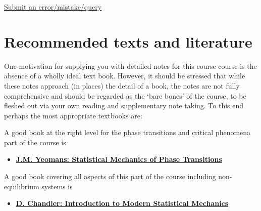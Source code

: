 \documentclass[
  letterpaper,
  enabledeprecatedfontcommands]{report}
\providecommand{\tightlist}{%
  \setlength{\itemsep}{0pt}\setlength{\parskip}{0pt}}
\begin{document}
\begin{tcolorbox}[enhanced jigsaw, colback=white, leftrule=.75mm, breakable, bottomrule=.15mm, left=2mm, arc=.35mm, toprule=.15mm, rightrule=.15mm, opacityback=0, colframe=quarto-callout-note-color-frame]

\href{https://forms.office.com/e/6uL2Bd5QGq}{Submit an
error/mistake/query}

\end{tcolorbox}


\chapter*{Recommended texts and literature}\label{literature}


One motivation for supplying you with detailed notes for this course
course is the absence of a wholly ideal text book. However, it should be
stressed that while these notes approach (in places) the detail of a
book, the notes are not fully comprehensive and should be regarded as
the `bare bones' of the course, to be fleshed out via your own reading
and supplementary note taking. To this end perhaps the most appropriate
textbooks are:

A good book at the right level for the phase transitions and critical
phenomena part of the course is

\begin{itemize}
\tightlist
\item
  \textbf{\href{https://bris.on.worldcat.org/search/detail/24699159?queryString=yeomans\%20statistical&clusterResults=true&stickyFacetsChecked=true&groupVariantRecords=false&newsArticles=off&bookReviews=off}{J.M.
  Yeomans: Statistical Mechanics of Phase Transitions}}
\end{itemize}

A good book covering all aspects of this part of the course including
non-equilibrium systems is

\begin{itemize}
\tightlist
\item
  \textbf{\href{https://bris.on.worldcat.org/search/detail/941821555?queryString=chandler\%20statistical&clusterResults=true&stickyFacetsChecked=true&groupVariantRecords=false&newsArticles=off&bookReviews=off}{D.
  Chandler: Introduction to Modern Statistical Mechanics}}
\end{itemize}
\end{document}
